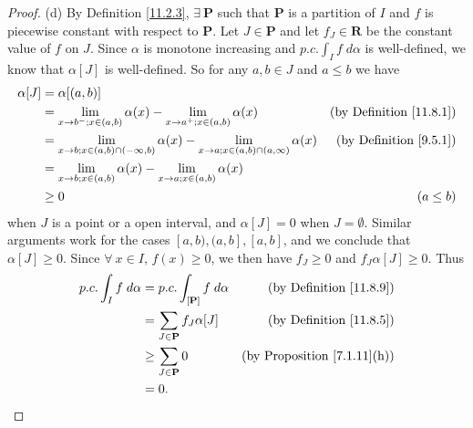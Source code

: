 \begin{proof}{(d)}
    By Definition \ref{11.2.3}, \(\exists\ \mathbf{P}\) such that \(\mathbf{P}\) is a partition of \(I\) and \(f\) is piecewise constant with respect to \(\mathbf{P}\).
    Let \(J \in \mathbf{P}\) and let \(f_J \in \mathbf{R}\) be the constant value of \(f\) on \(J\).
    Since \(\alpha\) is monotone increasing and \(p.c. \int_I f \; d \alpha\) is well-defined, we know that \(\alpha[J]\) is well-defined.
    So for any \(a, b \in J\) and \(a \leq b\) we have
    \begin{align*}
        \alpha[J] & = \alpha[(a, b)]                                                                                                                                             \\
                  & = \lim_{x \to b^- ; x \in (a, b)} \alpha(x) - \lim_{x \to a^+ ; x \in (a, b)} \alpha(x)                                & \text{(by Definition \ref{11.8.1})} \\
                  & = \lim_{x \to b ; x \in (a, b) \cap (-\infty, b)} \alpha(x) - \lim_{x \to a ; x \in (a, b) \cap (a, \infty)} \alpha(x) & \text{(by Definition \ref{9.5.1})}  \\
                  & = \lim_{x \to b ; x \in (a, b)} \alpha(x) - \lim_{x \to a ; x \in (a, b)} \alpha(x)                                                                          \\
                  & \geq 0                                                                                                                 & (a \leq b)
    \end{align*}
    when \(J\) is a point or a open interval, and \(\alpha[J] = 0\) when \(J = \emptyset\).
    Similar arguments work for the cases \([a, b), (a, b], [a, b]\), and we conclude that \(\alpha[J] \geq 0\).
    Since \(\forall\ x \in I\), \(f(x) \geq 0\), we then have \(f_J \geq 0\) and \(f_J \alpha[J] \geq 0\).
    Thus
    \begin{align*}
        p.c. \int_I f \; d \alpha & = p.c. \int_{[\mathbf{P}]} f \; d \alpha & \text{(by Definition \ref{11.8.9})}     \\
                                  & = \sum_{J \in \mathbf{P}} f_J \alpha[J]  & \text{(by Definition \ref{11.8.5})}     \\
                                  & \geq \sum_{J \in \mathbf{P}} 0           & \text{(by Proposition \ref{7.1.11}(h))} \\
                                  & = 0.
    \end{align*}
\end{proof}

